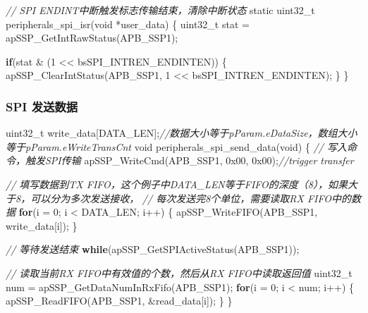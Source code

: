 \documentclass[
  12pt,
]{book}
\newenvironment{Shaded}{\begin{snugshade}}{\end{snugshade}}
\newcommand{\BaseNTok}[1]{\textcolor[rgb]{0.00,0.00,0.81}{#1}}
\newcommand{\CommentTok}[1]{\textcolor[rgb]{0.56,0.35,0.01}{\textit{#1}}}
\newcommand{\ControlFlowTok}[1]{\textcolor[rgb]{0.13,0.29,0.53}{\textbf{#1}}}
\newcommand{\DataTypeTok}[1]{\textcolor[rgb]{0.13,0.29,0.53}{#1}}
\newcommand{\DecValTok}[1]{\textcolor[rgb]{0.00,0.00,0.81}{#1}}
\newcommand{\NormalTok}[1]{#1}
\begin{document}
\begin{Shaded}
\begin{Highlighting}[]
\CommentTok{// SPI ENDINT中断触发标志传输结束，清除中断状态}
\DataTypeTok{static} \DataTypeTok{uint32_t}\NormalTok{ peripherals_spi_isr(}\DataTypeTok{void}\NormalTok{ *user_data)}
\NormalTok{\{}
  \DataTypeTok{uint32_t}\NormalTok{ stat = apSSP_GetIntRawStatus(APB_SSP1);}
  
  \ControlFlowTok{if}\NormalTok{(stat & (}\DecValTok{1}\NormalTok{ << bsSPI_INTREN_ENDINTEN))}
\NormalTok{  \{}
\NormalTok{    apSSP_ClearIntStatus(APB_SSP1, }\DecValTok{1}\NormalTok{ << bsSPI_INTREN_ENDINTEN);}
\NormalTok{  \}  }
\NormalTok{\}}
\end{Highlighting}
\end{Shaded}

\hypertarget{spi-ux53d1ux9001ux6570ux636e-2}{%
\subsubsection{SPI 发送数据}\label{spi-ux53d1ux9001ux6570ux636e-2}}

\begin{Shaded}
\begin{Highlighting}[]
\DataTypeTok{uint32_t}\NormalTok{ write_data[DATA_LEN];}\CommentTok{//数据大小等于pParam.eDataSize，数组大小等于pParam.eWriteTransCnt}
\DataTypeTok{void}\NormalTok{ peripherals_spi_send_data(}\DataTypeTok{void}\NormalTok{)}
\NormalTok{\{}
  \CommentTok{// 写入命令，触发SPI传输}
\NormalTok{  apSSP_WriteCmd(APB_SSP1, }\BaseNTok{0x00}\NormalTok{, }\BaseNTok{0x00}\NormalTok{);}\CommentTok{//trigger transfer}
  
  \CommentTok{// 填写数据到TX FIFO，这个例子中DATA_LEN等于FIFO的深度（8），如果大于8，可以分为多次发送接收，}
  \CommentTok{// 每次发送完8个单位，需要读取RX FIFO中的数据}
  \ControlFlowTok{for}\NormalTok{(i = }\DecValTok{0}\NormalTok{; i < DATA_LEN; i++)}
\NormalTok{  \{}
\NormalTok{    apSSP_WriteFIFO(APB_SSP1, write_data[i]);}
\NormalTok{  \}}

  \CommentTok{// 等待发送结束}
  \ControlFlowTok{while}\NormalTok{(apSSP_GetSPIActiveStatus(APB_SSP1));}
  
  \CommentTok{// 读取当前RX FIFO中有效值的个数，然后从RX FIFO中读取返回值}
  \DataTypeTok{uint32_t}\NormalTok{ num = apSSP_GetDataNumInRxFifo(APB_SSP1);}
  \ControlFlowTok{for}\NormalTok{(i = }\DecValTok{0}\NormalTok{; i < num; i++)}
\NormalTok{  \{}
\NormalTok{    apSSP_ReadFIFO(APB_SSP1, &read_data[i]);}
\NormalTok{  \}}
\NormalTok{\}}
\end{Highlighting}
\end{Shaded}
\end{document}
